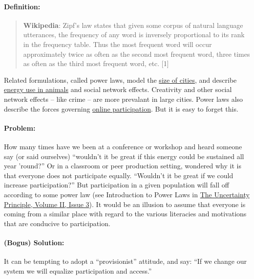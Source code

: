 \paragraph{Definition:}

\begin{quote}
\textbf{Wikipedia}: Zipf's law states that given some corpus of natural
language utterances, the frequency of any word is inversely proportional
to its rank in the frequency table. Thus the most frequent word will
occur approximately twice as often as the second most frequent word,
three times as often as the third most frequent word, etc. {[}1{]}
\end{quote}

Related formulations, called power laws, model the
\href{http://www2.econ.uu.nl/users/marrewijk/geography/zipf/index.htm}{size
of cities}, and describe
\href{http://pricetags.wordpress.com/2010/10/26/kleibers-law-growth-and-creativity-in-cities/}{energy
use in animals} and social network effects. Creativity and other social
network effects -- like crime -- are more prevalant in large cities.
Power laws also describe the forces governing
\href{http://shirky.com/writings/powerlaw_weblog.html}{online
participation}. But it is easy to forget this.

\paragraph{Problem:} How many times have we been at a conference or
workshop and heard someone say (or said ourselves) ``wouldn't it be
great if this energy could be sustained all year 'round?'' Or in a
classroom or peer production setting, wondered why it is that everyone
does not participate equally. ``Wouldn't it be great if we could
increase participation?'' But participation in a given population will
fall off according to some power law (see Introduction to Power Laws in
\href{http://www.theuncertaintyprinciple.danoff.org/v2i3.html}{The
Uncertainty Principle, Volume II, Issue 3}). It would be an illusion to
assume that everyone is coming from a similar place with regard to the
various literacies and motivations that are conducive to participation.

\paragraph{(Bogus) Solution:} It can be tempting to adopt a ``provisionist''
attitude, and say: ``If we change our system we will equalize
participation and access.''

